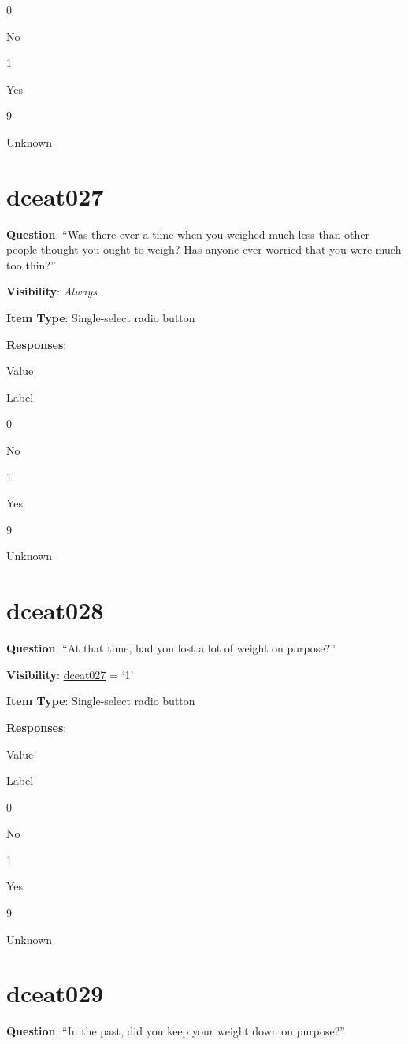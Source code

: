 \documentclass[]{book}
\begin{document}
0

No

1

Yes

9

Unknown

\hypertarget{dceat027}{%
\section{dceat027}\label{dceat027}}

\textbf{Question}: ``Was there ever a time when you weighed much less than other people thought you ought to weigh? Has anyone ever worried that you were much too thin?''

\textbf{Visibility}: \emph{Always}

\textbf{Item Type}: Single-select radio button

\textbf{Responses}:

Value

Label

0

No

1

Yes

9

Unknown

\hypertarget{dceat028}{%
\section{dceat028}\label{dceat028}}

\textbf{Question}: ``At that time, had you lost a lot of weight on purpose?''

\textbf{Visibility}: \protect\hyperlink{dceat027}{dceat027} = `1'

\textbf{Item Type}: Single-select radio button

\textbf{Responses}:

Value

Label

0

No

1

Yes

9

Unknown

\hypertarget{dceat029}{%
\section{dceat029}\label{dceat029}}

\textbf{Question}: ``In the past, did you keep your weight down on purpose?''
\end{document}
